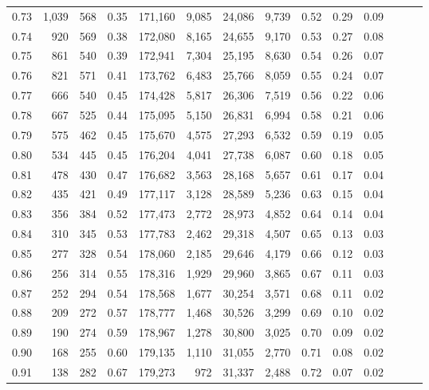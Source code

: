\begin{tabular}{rrrrrrrrrrrrrr}
0.73 &  1,039 &  568 &  0.35 &  171,160 &    9,085 &  24,086 &   9,739 &  0.52 &  0.29 &      0.09 \\
0.74 &    920 &  569 &  0.38 &  172,080 &    8,165 &  24,655 &   9,170 &  0.53 &  0.27 &      0.08 \\
0.75 &    861 &  540 &  0.39 &  172,941 &    7,304 &  25,195 &   8,630 &  0.54 &  0.26 &      0.07 \\
0.76 &    821 &  571 &  0.41 &  173,762 &    6,483 &  25,766 &   8,059 &  0.55 &  0.24 &      0.07 \\
0.77 &    666 &  540 &  0.45 &  174,428 &    5,817 &  26,306 &   7,519 &  0.56 &  0.22 &      0.06 \\
0.78 &    667 &  525 &  0.44 &  175,095 &    5,150 &  26,831 &   6,994 &  0.58 &  0.21 &      0.06 \\
0.79 &    575 &  462 &  0.45 &  175,670 &    4,575 &  27,293 &   6,532 &  0.59 &  0.19 &      0.05 \\
0.80 &    534 &  445 &  0.45 &  176,204 &    4,041 &  27,738 &   6,087 &  0.60 &  0.18 &      0.05 \\
0.81 &    478 &  430 &  0.47 &  176,682 &    3,563 &  28,168 &   5,657 &  0.61 &  0.17 &      0.04 \\
0.82 &    435 &  421 &  0.49 &  177,117 &    3,128 &  28,589 &   5,236 &  0.63 &  0.15 &      0.04 \\
0.83 &    356 &  384 &  0.52 &  177,473 &    2,772 &  28,973 &   4,852 &  0.64 &  0.14 &      0.04 \\
0.84 &    310 &  345 &  0.53 &  177,783 &    2,462 &  29,318 &   4,507 &  0.65 &  0.13 &      0.03 \\
0.85 &    277 &  328 &  0.54 &  178,060 &    2,185 &  29,646 &   4,179 &  0.66 &  0.12 &      0.03 \\
0.86 &    256 &  314 &  0.55 &  178,316 &    1,929 &  29,960 &   3,865 &  0.67 &  0.11 &      0.03 \\
0.87 &    252 &  294 &  0.54 &  178,568 &    1,677 &  30,254 &   3,571 &  0.68 &  0.11 &      0.02 \\
0.88 &    209 &  272 &  0.57 &  178,777 &    1,468 &  30,526 &   3,299 &  0.69 &  0.10 &      0.02 \\
0.89 &    190 &  274 &  0.59 &  178,967 &    1,278 &  30,800 &   3,025 &  0.70 &  0.09 &      0.02 \\
0.90 &    168 &  255 &  0.60 &  179,135 &    1,110 &  31,055 &   2,770 &  0.71 &  0.08 &      0.02 \\
0.91 &    138 &  282 &  0.67 &  179,273 &      972 &  31,337 &   2,488 &  0.72 &  0.07 &      0.02 \\

\end{tabular}
